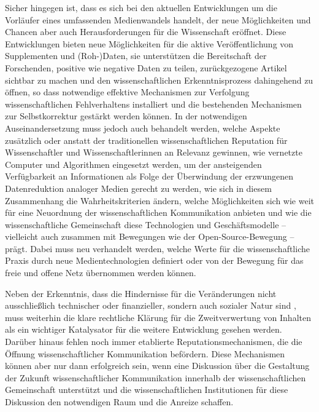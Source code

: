 Sicher hingegen ist, dass es sich bei den aktuellen Entwicklungen um die Vorläufer eines umfassenden Medienwandels handelt, der neue Möglichkeiten und Chancen aber auch Herausforderungen für die Wissenschaft eröffnet. Diese Entwicklungen bieten neue Möglichkeiten für die aktive Veröffentlichung von Supplementen und (Roh-)Daten, sie unterstützen die Bereitschaft der Forschenden, positive wie negative Daten zu teilen, zurückgezogene Artikel sichtbar zu machen und den wissenschaftlichen Erkenntnisprozess dahingehend zu öffnen, so dass notwendige effektive Mechanismen zur Verfolgung wissenschaftlichen Fehlverhaltens installiert und die bestehenden Mechanismen zur Selbstkorrektur gestärkt werden können. In der notwendigen Auseinandersetzung muss jedoch auch behandelt werden, welche Aspekte zusätzlich oder anstatt der traditionellen wissenschaftlichen Reputation für Wissenschaftler und Wissenschaftlerinnen an Relevanz gewinnen, wie vernetzte Computer und Algorithmen eingesetzt werden, um der ansteigenden Verfügbarkeit an Informationen als Folge der Überwindung der erzwungenen Datenreduktion analoger Medien gerecht zu werden, wie sich in diesem Zusammenhang die Wahrheitskriterien ändern, welche Möglichkeiten sich wie weit für eine Neuordnung der wissenschaftlichen Kommunikation anbieten und wie die wissenschaftliche Gemeinschaft diese Technologien und Geschäftsmodelle – vielleicht auch zusammen mit Bewegungen wie der Open-Source-Bewegung – prägt. Dabei muss neu verhandelt werden, welche Werte für die wissenschaftliche Praxis durch neue Medientechnologien definiert oder von der Bewegung für das freie und offene Netz übernommen werden können.

Neben der Erkenntnis, dass die Hindernisse für die Veränderungen nicht ausschließlich technischer oder finanzieller, sondern auch sozialer Natur sind \cite{Nosek_2012}, muss weiterhin die klare rechtliche Klärung für die Zweitverwertung von Inhalten als ein wichtiger Katalysator für die weitere Entwicklung gesehen werden. Darüber hinaus fehlen noch immer etablierte Reputationsmechanismen, die die Öffnung wissenschaftlicher Kommunikation befördern. Diese Mechanismen können aber nur dann erfolgreich sein, wenn eine Diskussion über die Gestaltung der Zukunft wissenschaftlicher Kommunikation innerhalb der wissenschaftlichen Gemeinschaft unterstützt und die wissenschaftlichen Institutionen für diese Diskussion den notwendigen Raum und die Anreize schaffen.

